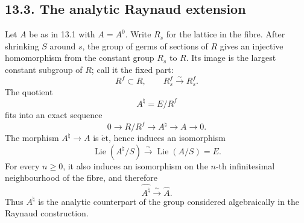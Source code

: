 \documentclass[11pt]{article}
\providecommand{\Lie}{\operatorname{Lie}}
\providecommand{\etale}{\mathrm{\acute et}}
\begin{document}
\subsection*{13.3. The analytic Raynaud extension}

Let \(A\) be as in 13.1 with \(A=A^0\).  Write \(R_s\) for the lattice in the fibre.  After shrinking \(S\) around \(s\), the group of germs of sections of \(R\) gives an injective homomorphism from the constant group \(R_s\) to \(R\).  Its image is the largest constant subgroup of \(R\); call it the fixed part:
\begin{equation}\tag{13.3.2}
        R^f\subset R,
        \qquad R^f_s\xrightarrow{\sim}R_s^f.
\end{equation}
The quotient
\begin{equation}\tag{13.3.3}
        A^\natural=E/R^f
\end{equation}
fits into an exact sequence
\begin{equation}\tag{13.3.4}
        0\longrightarrow R/R^f\longrightarrow A^\natural\longrightarrow A\longrightarrow 0.
\end{equation}
The morphism \(A^\natural\to A\) is \(\etale\), hence induces an isomorphism
\begin{equation}\tag{13.3.5}
        \Lie(A^\natural/S)\xrightarrow{\sim}\Lie(A/S)=E.
\end{equation}
For every \(n\geq 0\), it also induces an isomorphism on the \(n\)-th infinitesimal neighbourhood of the fibre, and therefore
\begin{equation}\tag{13.3.6}
        \widehat{A^\natural}\xrightarrow{\sim}\widehat A.
\end{equation}
Thus \(A^\natural\) is the analytic counterpart of the group considered algebraically in the Raynaud construction.
\end{document}

